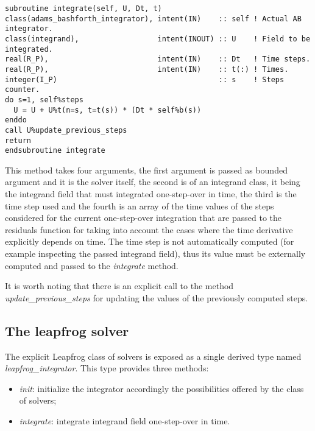 \documentclass[pdftex,preprint,3p,times,numbers]{elsarticle}
\begin{document}
\begin{lstlisting}[firstnumber=1,style=code,caption={implementation of the \emph{integrate} method of explicit Adams-Bashforth class},label={list:ab_integrate}]
subroutine integrate(self, U, Dt, t)
class(adams_bashforth_integrator), intent(IN)    :: self ! Actual AB integrator.
class(integrand),                  intent(INOUT) :: U    ! Field to be integrated.
real(R_P),                         intent(IN)    :: Dt   ! Time steps.
real(R_P),                         intent(IN)    :: t(:) ! Times.
integer(I_P)                                     :: s    ! Steps counter.
do s=1, self%steps
  U = U + U%t(n=s, t=t(s)) * (Dt * self%b(s))
enddo
call U%update_previous_steps
return
endsubroutine integrate
\end{lstlisting}

This method takes four arguments, the first argument is passed as bounded argument and it is the solver itself, the second is of an integrand class, it being the integrand field that must integrated one-step-over in time, the third is the time step used and the fourth is an array of the time values of the steps considered for the current one-step-over integration that are passed to the residuals function for taking into account the cases where the time derivative explicitly depends on time. The time step is not automatically computed (for example inspecting the passed integrand field), thus its value must be externally computed and passed to the \emph{integrate} method.

It is worth noting that there is an explicit call to the method \emph{update\_previous\_steps} for updating the values of the previously computed steps.

\subsection{The leapfrog solver}\label{subsec:solver_leapfrog}

The explicit Leapfrog class of solvers is exposed as a single derived type named \emph{leapfrog\_integrator}. This type provides three methods:

\begin{itemize}
  \item \emph{init}: initialize the integrator accordingly the possibilities offered by the class of solvers;
  \item \emph{integrate}: integrate integrand field one-step-over in time.
  \end{itemize}
\end{document}
